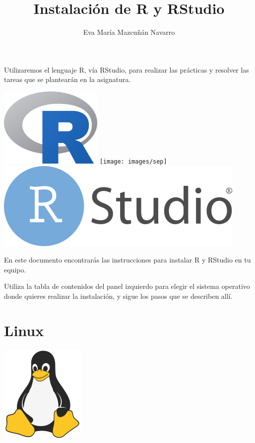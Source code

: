 \documentclass[
  title=normal,
  notoc,
  bib=normal]{mnye}
\title{Instalación de R y RStudio}
\author{Eva María Mazcuñán Navarro}
\date{}
\begin{document}
\maketitle

%

{
\hypersetup{linkcolor=etoccolor}
\setcounter{tocdepth}{2}
\tableofcontents
}
\hypertarget{section}{%
\section*{}\label{section}}

Utilizaremos el lenguaje \textsf{R}, vía \textsf{RStudio}, para realizar las prácticas y resolver las tareas que se plantearán en la asignatura.

\begin{center}\includegraphics[width=0.14\linewidth]{images/r-logo} \texttt{[image: images/sep]} \includegraphics[width=0.3\linewidth]{images/rstudio-logo} \end{center}

En este documento encontrarás las instrucciones para instalar \textsf{R} y \textsf{RStudio} en tu equipo.

Utiliza la tabla de contenidos del panel izquierdo para elegir el sistema operativo donde quieres realizar la instalación, y sigue los pasos que se describen allí.

\hypertarget{linux}{%
\section{Linux}\label{linux}}

\begin{center}\includegraphics[width=0.15\linewidth]{images/os/tux-flat} \end{center}
\end{document}
